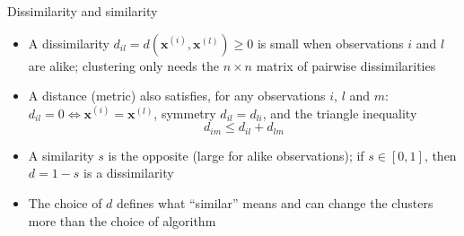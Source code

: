 \begin{frame}{Dissimilarity and similarity}
    \begin{itemize}
        \item A dissimilarity $d_{il} = d(\mathbf{x}^{(i)}, \mathbf{x}^{(l)}) \geq 0$ is small when observations $i$ and $l$ are alike; clustering only needs the $n \times n$ matrix of pairwise dissimilarities
        \item A distance (metric) also satisfies, for any observations $i$, $l$ and $m$: $d_{il} = 0 \iff \mathbf{x}^{(i)} = \mathbf{x}^{(l)}$, symmetry $d_{il} = d_{li}$, and the triangle inequality
        \[
            d_{im} \leq d_{il} + d_{lm}
        \]
        \item A similarity $s$ is the opposite (large for alike observations); if $s \in [0, 1]$, then $d = 1 - s$ is a dissimilarity
        \item The choice of $d$ defines what ``similar'' means and can change the clusters more than the choice of algorithm
    \end{itemize}
\end{frame}

